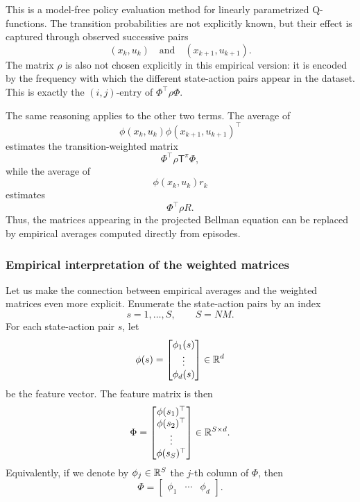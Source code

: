 This is a model-free policy evaluation method for linearly parametrized Q-functions. The
transition probabilities are not explicitly known, but their effect is captured through observed
successive pairs
\[
(x_k,u_k)
\quad\text{and}\quad
(x_{k+1},u_{k+1}).
\]
The matrix \(\rho\) is also not chosen explicitly in this empirical version: it is encoded by the
frequency with which the different state-action pairs appear in the dataset.
This is exactly the \((i,j)\)-entry of \(\Phi^\top\rho\Phi\).

The same reasoning applies to the other two terms. The average of
\[
\phi(x_k,u_k)\phi(x_{k+1},u_{k+1})^\top
\]
estimates the transition-weighted matrix
\[
\Phi^\top\rho\mathsf{T}^{\pi}\Phi,
\]
while the average of
\[
\phi(x_k,u_k)r_k
\]
estimates
\[
\Phi^\top\rho R.
\]
Thus, the matrices appearing in the projected Bellman equation can be replaced by empirical
averages computed directly from episodes.

\subsubsection{Empirical interpretation of the weighted matrices}

Let us make the connection between empirical averages and the weighted matrices even more
explicit. Enumerate the state-action pairs by an index
\[
s=1,\dots,S,
\qquad S=NM.
\]
For each state-action pair \(s\), let
\[
\phi(s)
=
\begin{bmatrix}
\phi_1(s)\\
\vdots\\
\phi_d(s)
\end{bmatrix}
\in\mathbb{R}^d
\]
be the feature vector. The feature matrix is then
\[
\Phi
=
\begin{bmatrix}
\phi(s_1)^\top\\
\phi(s_2)^\top\\
\vdots\\
\phi(s_S)^\top
\end{bmatrix}
\in\mathbb{R}^{S\times d}.
\]
Equivalently, if we denote by \(\phi_j\in\mathbb{R}^S\) the \(j\)-th column of \(\Phi\), then
\[
\Phi
=
\begin{bmatrix}
\phi_1 & \cdots & \phi_d
\end{bmatrix}.
\]

